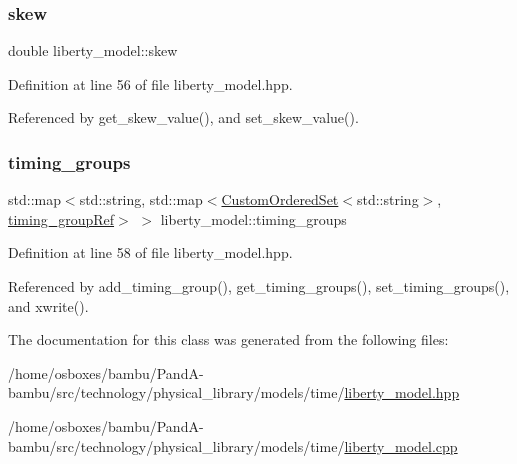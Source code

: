\subsubsection{\texorpdfstring{skew}{skew}}
{\footnotesize\ttfamily double liberty\+\_\+model\+::skew\hspace{0.3cm}{\ttfamily [private]}}



Definition at line 56 of file liberty\+\_\+model.\+hpp.



Referenced by get\+\_\+skew\+\_\+value(), and set\+\_\+skew\+\_\+value().

\mbox{\label{classliberty__model_a35b42c0531685ae05069c6fd083231e9}} 
\subsubsection{\texorpdfstring{timing\+\_\+groups}{timing\_groups}}
{\footnotesize\ttfamily std\+::map$<$std\+::string, std\+::map$<$\hyperlink{classCustomOrderedSet}{Custom\+Ordered\+Set}$<$std\+::string$>$, \hyperlink{timing__group_8hpp_a343803fe4e1a65fd6b57b504c2ed67ca}{timing\+\_\+group\+Ref}$>$ $>$ liberty\+\_\+model\+::timing\+\_\+groups\hspace{0.3cm}{\ttfamily [private]}}



Definition at line 58 of file liberty\+\_\+model.\+hpp.



Referenced by add\+\_\+timing\+\_\+group(), get\+\_\+timing\+\_\+groups(), set\+\_\+timing\+\_\+groups(), and xwrite().



The documentation for this class was generated from the following files\+:\begin{DoxyCompactItemize}
\item 
/home/osboxes/bambu/\+Pand\+A-\/bambu/src/technology/physical\+\_\+library/models/time/\hyperlink{liberty__model_8hpp}{liberty\+\_\+model.\+hpp}\item 
/home/osboxes/bambu/\+Pand\+A-\/bambu/src/technology/physical\+\_\+library/models/time/\hyperlink{liberty__model_8cpp}{liberty\+\_\+model.\+cpp}\end{DoxyCompactItemize}
